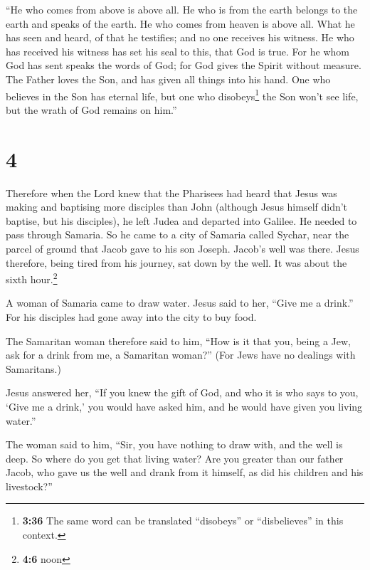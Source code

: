  ``He who comes from above is above all. He who is from
the earth belongs to the earth and speaks of the earth. He who comes
from heaven is above all.  What he has seen and heard, of
that he testifies; and no one receives his witness.  He
who has received his witness has set his seal to this, that God is true.
 For he whom God has sent speaks the words of God; for
God gives the Spirit without measure.  The Father loves
the Son, and has given all things into his hand.  One who
believes in the Son has eternal life, but one who disobeys\footnote{\textbf{3:36}
  The same word can be translated ``disobeys'' or ``disbelieves'' in
  this context.} the Son won't see life, but the wrath of God remains on
him.''

\hypertarget{section-3}{%
\section{4}\label{section-3}}

 Therefore when the Lord knew that the Pharisees had heard
that Jesus was making and baptising more disciples than John
 (although Jesus himself didn't baptise, but his
disciples),  he left Judea and departed into Galilee.
 He needed to pass through Samaria.  So he
came to a city of Samaria called Sychar, near the parcel of ground that
Jacob gave to his son Joseph.  Jacob's well was there.
Jesus therefore, being tired from his journey, sat down by the well. It
was about the sixth hour.\footnote{\textbf{4:6} noon}

 A woman of Samaria came to draw water. Jesus said to her,
``Give me a drink.''  For his disciples had gone away into
the city to buy food.

 The Samaritan woman therefore said to him, ``How is it
that you, being a Jew, ask for a drink from me, a Samaritan woman?''
(For Jews have no dealings with Samaritans.)

 Jesus answered her, ``If you knew the gift of God, and
who it is who says to you, `Give me a drink,' you would have asked him,
and he would have given you living water.''

 The woman said to him, ``Sir, you have nothing to draw
with, and the well is deep. So where do you get that living water?
 Are you greater than our father Jacob, who gave us the
well and drank from it himself, as did his children and his livestock?''

